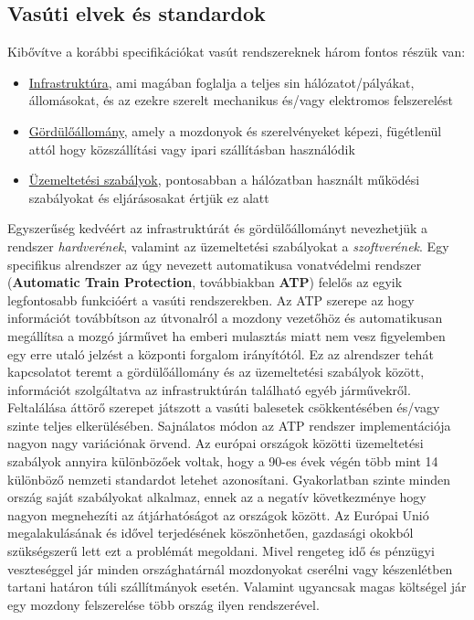 \documentclass[a4paper,12pt]{article}
\begin{document}
\subsection{Vasúti elvek és standardok}
Kibővítve a korábbi specifikációkat vasút rendszereknek három fontos részük van:
\begin{itemize}
	\item \underline{Infrastruktúra}, ami magában foglalja a teljes sin hálózatot/pályákat, állomásokat, és az ezekre szerelt mechanikus és/vagy elektromos felszerelést
	\item \underline{Gördülőállomány}, amely a mozdonyok és szerelvényeket képezi, fügétlenül attól hogy közszállítási vagy ipari szállításban használódik
	\item \underline{Üzemeltetési szabályok}, pontosabban a hálózatban használt működési szabályokat és eljárásosakat értjük ez alatt
\end{itemize}
\par Egyszerűség kedvéért az infrastruktúrát és gördülőállományt nevezhetjük a rendszer \textit{hardverének}, valamint az üzemeltetési szabályokat a \textit{szoftverének}.
Egy specifikus alrendszer az úgy nevezett automatikusa vonatvédelmi rendszer (\textbf{Automatic Train Protection}, továbbiakban \textbf{ATP}) felelős az egyik legfontosabb funkcióért a vasúti rendszerekben.
Az ATP szerepe az hogy információt továbbítson az útvonalról a mozdony vezetőhöz és automatikusan megállítsa a mozgó járművet ha emberi mulasztás miatt nem vesz figyelemben egy erre utaló jelzést a központi forgalom irányítótól. 
Ez az alrendszer tehát kapcsolatot teremt a gördülőállomány és az üzemeltetési szabályok között, információt szolgáltatva az infrastruktúrán található egyéb járművekről.
Feltalálása áttörő szerepet játszott a vasúti balesetek csökkentésében és/vagy szinte teljes elkerülésében. Sajnálatos módon az ATP rendszer implementációja nagyon nagy variációnak örvend.
Az európai országok közötti üzemeltetési szabályok annyira különbözőek voltak, hogy a 90-es évek végén több mint 14 különböző nemzeti standardot letehet azonosítani. 
Gyakorlatban szinte minden ország saját szabályokat alkalmaz, ennek az a negatív következménye hogy nagyon megnehezíti az átjárhatóságot az országok között. 
Az Európai Unió megalakulásának és idővel terjedésének köszönhetően, gazdasági okokból szükségszerű lett ezt a problémát megoldani. Mivel rengeteg idő és pénzügyi veszteséggel jár
minden országhatárnál mozdonyokat cserélni vagy készenlétben tartani határon túli szállítmányok esetén. Valamint ugyancsak magas költségel jár egy mozdony felszerelése több ország ilyen rendszerével.
\end{document}
